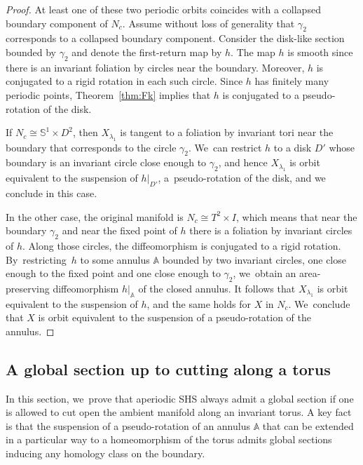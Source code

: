 \documentclass[10pt]{amsart}
\theoremstyle{definition}
\newcommand{\mS}{\mathbb{S}}
\begin{document}
\begin{proof}
At least one of these two periodic orbits coincides with a collapsed boundary component of $N_c$. Assume without loss of generality that $\gamma_2$ corresponds to a collapsed boundary component. Consider the disk-like section bounded by $\gamma_2$ and denote the first-return map by $h$. The map $h$ is smooth since there is an invariant foliation by circles near the boundary. Moreover, $h$ is conjugated to a rigid rotation in each such circle. Since $h$ has finitely many periodic points, Theorem~\ref{thm:Fk} implies that $h$ is conjugated to a pseudo-rotation of the disk.\enlargethispage{-.5\baselineskip}

If $N_c\cong \mS^1\times D^2$, then $X_{\lambda_1}$ is tangent to a foliation by invariant tori near the boundary that corresponds to the circle $\gamma_2$. We~can restrict $h$ to a disk $D'$ whose boundary is an invariant circle close enough to $\gamma_2$, and hence $X_{\lambda_1}$ is orbit equivalent to the suspension of $h|_{D'}$, a~pseudo-rotation of the disk, and we conclude in this case.

In the other case, the original manifold is $N_c\cong T^2\times I$, which means that near the boundary $\gamma_2$ and near the fixed point of $h$ there is a foliation by invariant circles of $h$. Along those circles, the diffeomorphism is conjugated to a rigid rotation. By~restricting~$h$ to some annulus $\mathbb{A}$ bounded by two invariant circles, one close enough to the fixed point and one close enough to $\gamma_2$, we~obtain an area-preserving diffeomorphism $h|_\mathbb{A}$
of the closed annulus. It follows that $X_{\lambda_1}$ is orbit equivalent to the suspension of $h$, and the same holds for $X$ in $N_c$. We~conclude that $X$ is orbit equivalent to the suspension of a pseudo-rotation of the annulus.
\end{proof}

\subsection{A global section up to cutting along a torus}

In this section, we~prove that aperiodic SHS always admit a global section if one is allowed to cut open the ambient manifold along an invariant torus. A key fact is that the suspension of a pseudo-rotation of an annulus $\mathbb{A}$ that can be extended in a particular way to a homeomorphism of the torus admits global sections inducing any homology class on the boundary.
\end{document}

